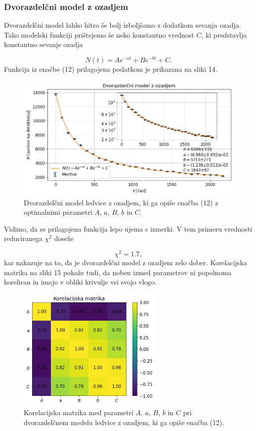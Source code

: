 \documentclass[slovene,11pt,a4paper]{article}
\begin{document}
\subsubsection{Dvorazdelčni model z ozadjem}

Dvorazdelčni model lahko hitro še bolj izboljšamo z dodatkom sevanja ozadja. Tako modelski funkciji prištejemo še neko konstantno vrednost $C$, ki predstavlja konstantno sevanje ozadja

\begin{equation}
N(t) = Ae^{-at} + Be^{-bt} + C.
\end{equation}
Funkcija iz enačbe (12) prilagojena podatkom je prikazana na sliki 14.

\begin{figure}[h!]
\centering
\includegraphics[width=13cm]{ledvice8.png}
\caption{Dvorazdelčni model ledvice z ozadjem, ki ga opiše enačba (12) z optimalnimi parametri $A$, $a$, $B$, $b$ in $C$.}
\end{figure}
Vidimo, da se prilagojena funkcija lepo ujema s izmerki. V tem primeru vrednosti reduciranega $\chi^2$ doseže

\[
\chi^2 = 1.7,
\]
kar nakazuje na to, da je dvorazdelčni model z ozadjem zelo dober. Korelacijska matrika na sliki 15 pokaže tudi, da noben izmed parametrov ni popolnoma koreliran in imajo v obliki krivulje vsi svojo vlogo.

\begin{figure}[h!]
\centering
\includegraphics[width=7cm]{ledvice9.png}
\caption{Korelacijska matrika med parametri $A$, $a$, $B$, $b$ in $C$ pri dvorazdelčnem modelu ledvice z ozadjem, ki ga opiše enačba (12).}
\end{figure}
\end{document}
